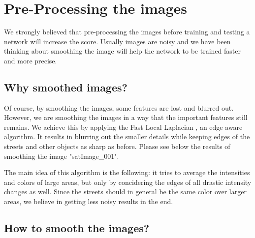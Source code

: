 \section{Pre-Processing the images}

We strongly believed that pre-processing the images before training and testing a network will increase the score. Usually images are noisy and we have been thinking about smoothing the image will help the network to be trained faster and more precise.

\subsection{Why smoothed images?}

Of course, by smoothing the images, some features are lost and blurred out. However, we are smoothing the images in a way that the important features still remains. We achieve this by applying the Fast Local Laplacian \cite{FLL}, an edge aware algorithm. It results in blurring out the smaller details while keeping edges of the streets and other objects as sharp as before. Please see below the results of smoothing the image "satImage\_001".


The main idea of this algorithm is the following: it tries to average the intensities and colors of large areas, but only by concidering the edges of all drastic intensity changes as well. Since the streets should in general be the same color over larger areas, we believe in getting less noisy results in the end.

\subsection{How to smooth the images?}

